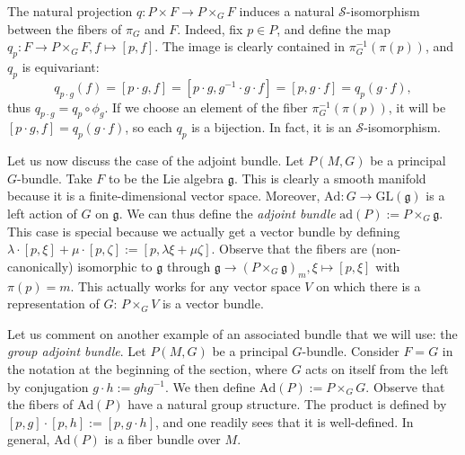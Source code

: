 \begin{obs}\label{def_q_p}
    The natural projection \(q\colon P \times F \to P \times_G F\) induces a natural \(\mathcal{S}\)-isomorphism between the fibers of \(\pi_G\) and \(F\). Indeed, fix \(p \in P\), and define the map \(q_p\colon F \to P \times_GF, f \mapsto [p,f]\). The image is clearly contained in \(\pi_G^{-1}(\pi(p))\), and \(q_p\) is equivariant:
    \[
    q_{p\cdot g}(f)=[p\cdot g, f]=[p \cdot g, g^{-1}\cdot g \cdot f]=[p, g \cdot f]=q_p(g \cdot f),
    \]
    thus \(q_{p \cdot g}=q_p \circ \phi_g\). If we choose an element of the fiber \(\pi_G^{-1}(\pi(p))\), it will be \([p \cdot g, f]=q_{p}(g\cdot f)\), so each \(q_p\) is a bijection. In fact, it is an \(\mathcal{S}\)-isomorphism.
\end{obs}

Let us now discuss the case of the adjoint bundle. Let \(P(M,G)\) be a principal \(G\)-bundle. Take \(F\) to be the Lie algebra \(\mathfrak{g}\). This is clearly a smooth manifold because it is a finite-dimensional vector space. Moreover, \(\mathrm{Ad}\colon G \to \mathrm{GL}(\mathfrak{g})\) is a left action of \(G\) on \(\mathfrak{g}\). We can thus define the \textit{adjoint bundle} \(\mathrm{ad}(P):=P \times_G \mathfrak{g}\). This case is special because we actually get a vector bundle by defining \(\lambda \cdot [p,  \xi]+\mu \cdot [p, \zeta]:=[p, \lambda \xi+\mu \zeta]\). Observe that the fibers are (non-canonically) isomorphic to \(\mathfrak{g}\) through \(\mathfrak{g}\to (P\times_G \mathfrak{g})_m, \xi \mapsto [p, \xi]\) with \(\pi(p)=m\). This actually works for any vector space \(V\) on which there is a representation of \(G\): \(P \times_G V\) is a vector bundle. 

\begin{example} \label{ex_group_adjoint_bundle}
    Let us comment on another example of an associated bundle that we will use: the \textit{group adjoint bundle}. Let \(P(M,G)\) be a principal \(G\)-bundle. Consider \(F=G\) in the notation at the beginning of the section, where \(G\) acts on itself from the left by conjugation \(g \cdot h :=ghg^{-1}\). We then define \(\mathrm{Ad}(P):=P \times_G G\). Observe that the fibers of \(\mathrm{Ad}(P)\) have a natural group structure. The product is defined by \([p, g] \cdot [p, h]:=[p, g\cdot h]\), and one readily sees that it is well-defined. In general, \(\mathrm{Ad}(P)\) is a fiber bundle over \(M\).
\end{example}

